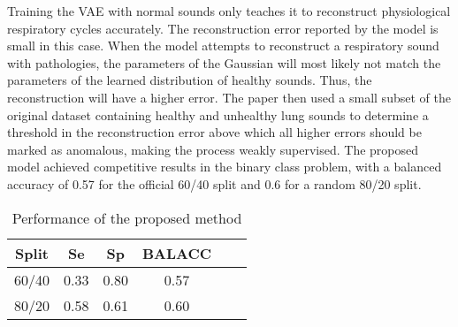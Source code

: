 Training the VAE with normal sounds only teaches it to reconstruct physiological respiratory cycles accurately. The reconstruction error reported by the model is small in this case. When the model attempts to reconstruct a respiratory sound with pathologies, the parameters of the Gaussian will most likely not match the parameters of the learned distribution of healthy sounds. Thus, the reconstruction will have a higher error. The paper then used a small subset of the original dataset containing healthy and unhealthy lung sounds to determine a threshold in the reconstruction error above which all higher errors should be marked as anomalous, making the process weakly supervised. The proposed model achieved competitive results in the binary class problem, with a balanced accuracy of 0.57 for the official 60/40 split and 0.6 for a random 80/20 split.

\begin{table}[h!]
    \centering
    \caption{Performance of the proposed method}
    \begin{tabular}{cccccc}
    \toprule
    \textbf{Split} & \textbf{Se} & \textbf{Sp} & \textbf{BALACC} \\
    \midrule
    60/40 & 0.33 & 0.80 & 0.57 \\
    80/20 & 0.58 & 0.61 & 0.60 \\
    \bottomrule
    \end{tabular}
\end{table}


